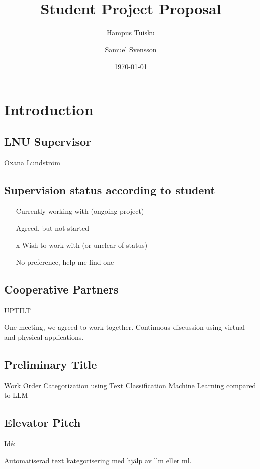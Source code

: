 \documentclass{article}
\title{Student Project Proposal}
\author{Hampus Tuisku \and Samuel Svensson}
\date{\today}
\begin{document}
\maketitle

\section{Introduction}

\subsection{LNU Supervisor}
Oxana Lundström

\subsection{Supervision status according to student}

\begin{itemize}
      \item [ ] Currently working with (ongoing project)
      \item [ ] Agreed, but not started
      \item [x] Wish to work with (or unclear of status)
      \item [ ] No preference, help me find one
\end{itemize}

\subsection{Cooperative Partners}

UPTILT

One meeting, we agreed to work together.
Continuous discussion using virtual and physical applications.

\subsection{Preliminary Title}

Work Order Categorization using Text Classification Machine Learning compared to LLM

\subsection{Elevator Pitch}

Idé:

Automatiserad text kategorisering med hjälp av llm eller ml.
\end{document}
